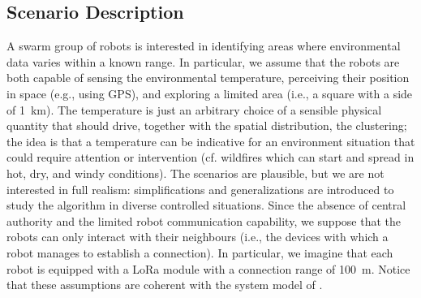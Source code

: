 \subsection{Scenario Description}\label{s:scenario-description}
%
A swarm group of robots is interested in identifying areas
 where environmental data varies within a known range.
%
In particular, we assume that the robots are both
 capable of sensing the environmental temperature,
 perceiving their position in space (e.g., using GPS),
 and exploring a limited area (i.e., a square with a side of \SI{1}{\kilo\metre}).
%
The temperature is just an arbitrary choice of
 a sensible physical quantity
 that should drive, together with the spatial distribution,
 the clustering;
 the idea is that a temperature can be indicative for
 an environment situation that could require attention or intervention (cf. wildfires which can start and spread in hot, dry, and windy conditions).
%
The scenarios are plausible, but we are not interested in full realism: simplifications and generalizations are introduced to study the algorithm in diverse controlled situations.
%
Since the absence of central authority and the limited robot communication capability,
 we suppose that the robots can only interact with their neighbours
 (i.e., the devices with which a robot manages to establish a connection).
In particular, we imagine that each robot is equipped with a LoRa module with
 a connection range of \SI{100}{\metre}.
%
%
Notice that these assumptions are coherent with the system model of .

